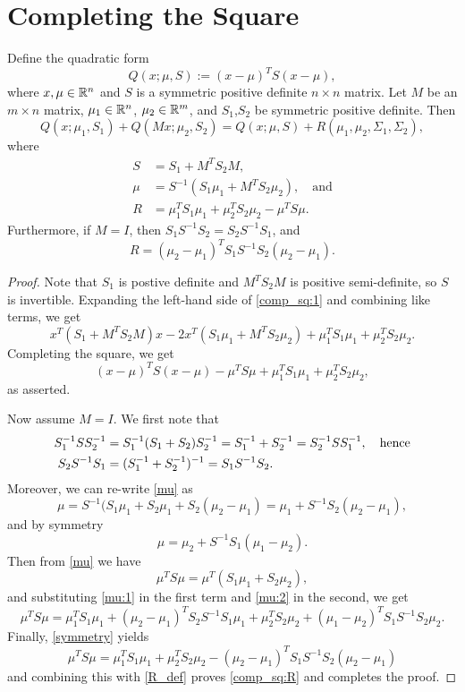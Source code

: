 \documentclass[12pt,leqno]{article}
\begin{document}
\section{Completing the Square} 
\begin{Lem}
 Define the quadratic form
  $$
 Q(x;\mu,S) := (x-\mu)^TS(x-\mu),
  $$
  where $x,\mu\in {\mathbb R}^n$ and  $S$ is a symmetric positive definite $n\times{n}$
  matrix. Let $M$ be an $m\times{n}$ matrix, $\mu_1\in{\mathbb R}^n$, $\mu_2\in{\mathbb R}^m$,
  and $S_1$,$S_2$ be symmetric positive definite.  Then 
\begin{equation}\label{comp_sq:1}
  Q(x;\mu_1,S_1)+Q(Mx;\mu_2,S_2) = Q(x;\mu,S) + R(\mu_1,\mu_2,\Sigma_1,\Sigma_2),
\end{equation}
where 
\begin{align}
S &= S_1 + M^TS_2M, \label{sigma}\\
\mu &= S^{-1}(S_1\mu_1 + M^TS_2\mu_2),\quad\text{and}\label{mu}\\
R &= \mu_1^TS_1\mu_1 + \mu_2^TS_2\mu_2 - \mu^TS\mu. \label{R_def} 
\end{align}
Furthermore, if $M = I$, then $S_1S^{-1}S_2 = S_2S^{-1}S_1$,  and
\begin{equation}\label{comp_sq:R}
R = (\mu_2-\mu_1)^TS_1S^{-1}S_2(\mu_2-\mu_1).
\end{equation}
\end{Lem}
\begin{proof}
  Note that $S_1$ is postive definite and $M^TS_2M$ is positive semi-definite,
so $S$ is invertible.  Expanding the left-hand side of \eqref{comp_sq:1} and combining
like terms, we get
$$
x^T(S_1+ M^TS_2M)x -2x^T(S_1\mu_1+ M^TS_2\mu_2) 
+ \mu_1^TS_1\mu_1 + \mu_2^TS_2\mu_2.
$$
Completing the square, we get
$$
(x-\mu)^TS(x-\mu) -\mu^TS\mu + \mu_1^TS_1\mu_1 + \mu_2^TS_2\mu_2,
$$
as asserted.

Now assume $M = I$. We first note that
\begin{align}
S_1^{-1}SS_2^{-1} &= S_1^{-1}(S_1+S_2)S_2^{-1} = S_1^{-1}+S_2^{-1} = S_2^{-1}SS_1^{-1},\quad\text{hence}\notag\\
S_2S^{-1}S_1 &= (S_1^{-1}+S_2^{-1})^{-1} = S_1S^{-1}S_2.\label{symmetry}
\end{align}
Moreover, we can re-write \eqref{mu} as
\begin{equation}\label{mu:1}
\mu = S^{-1}(S_1\mu_1 + S_2\mu_1 + S_2(\mu_2-\mu_1) = \mu_1 + S^{-1}S_2(\mu_2-\mu_1),
\end{equation}
and by symmetry
\begin{equation}\label{mu:2}
\mu = \mu_2 + S^{-1}S_1(\mu_1-\mu_2).
\end{equation}
Then from \eqref{mu} we have
$$
\mu^TS\mu = \mu^T(S_1\mu_1 + S_2\mu_2),
$$
and substituting \eqref{mu:1} in the first term and \eqref{mu:2} in the second, we get
$$
\mu^TS\mu = \mu_1^TS_1\mu_1 + (\mu_2-\mu_1)^TS_2S^{-1}S_1\mu_1 + \mu_2^TS_2\mu_2 + (\mu_1-\mu_2)^TS_1S^{-1}S_2\mu_2.
$$
Finally, \eqref{symmetry} yields
$$
\mu^TS\mu = \mu_1^TS_1\mu_1 + \mu_2^TS_2\mu_2 - (\mu_2-\mu_1)^TS_1S^{-1}S_2(\mu_2-\mu_1)
$$
and combining this with \eqref{R_def} proves \eqref{comp_sq:R} and completes the proof.
\end{proof}
\end{document}
